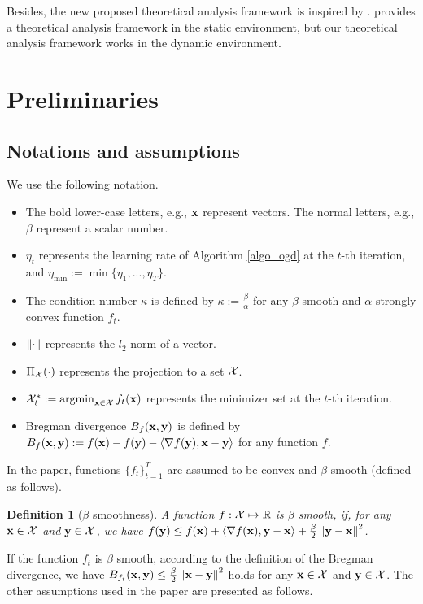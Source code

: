 \documentclass[journal]{IEEEtran}
\newtheorem{Definition}{\bf{Definition}}
\begin{document}
Besides, the new proposed theoretical analysis framework is inspired by \cite{Joulani:2017un}. \cite{Joulani:2017un} provides a theoretical analysis framework in the static environment, but our theoretical analysis framework works in the dynamic environment. 

\section{Preliminaries}
\label{sect_preliminary}


\subsection{Notations and assumptions}
We use the following notation. 
\begin{itemize}
\item 
The bold lower-case letters, e.g., ${\bf x}$  represent vectors.  The normal letters, e.g., $\beta$ represent a scalar number.  %
\item $\eta_t$ represents the learning rate of Algorithm \ref{algo_ogd} at  the $t$-th iteration, and $\eta_{\min} := \min\{\eta_1, ..., \eta_T\}$. 
\item 
The condition number $\kappa$ is defined by $\kappa := \frac{\beta}{\alpha}$ for any  $\beta$ smooth and  $\alpha$ strongly convex  function $f_t$.  
\item 
$\left\lVert\cdot\right\rVert$ represents the $l_2$ norm of a vector.  
\item 
$\Pi_{\mathcal{X}}(\cdot)$ represents the projection to a set ${\mathcal{X}}$. 
\item $\Xcal_t^{\ast} := \argmin_{\x\in\Xcal} f_t(\x)$ represents the minimizer set at the $t$-th iteration. 
\item
Bregman divergence $B_f({\bf x},{\bf y})$ is defined by $ B_f({\bf x},{\bf y}) := f({\bf x}) - f({\bf y}) - \left\langle\nabla f({\bf y}), {\bf x} - {\bf y} \right\rangle$ for any function $f$.  
\end{itemize}

In the paper, functions $\{f_t\}_{t=1}^T$ are assumed to be convex and $\beta$ smooth (defined as follows).  
\begin{Definition}[$\beta$ smoothness]
\label{definition_f_t_smooth}
A function $f: {\mathcal{X}}\mapsto \mathbb{R}$ is $\beta$ smooth, if, for any ${\bf x}\in{\mathcal{X}}$ and ${\bf y}\in{\mathcal{X}}$, we have $f({\bf y})\le f({\bf x})+\left\langle\nabla f({\bf x}), {\bf y}-{\bf x} \right\rangle + \frac{\beta}{2}\left\lVert{\bf y} - {\bf x}\right\rVert^2$.
\end{Definition} If the function $f_t$ is $\beta$ smooth, according to the definition of the Bregman divergence, we have $B_{f_t}({\bf x},{\bf y}) \le \frac{\beta}{2}\left\lVert{\bf x} - {\bf y}\right\rVert^2$ holds for any ${\bf x}\in{\mathcal{X}}$ and ${\bf y}\in{\mathcal{X}}$. The other assumptions used in the paper are presented as follows.
\end{document}
